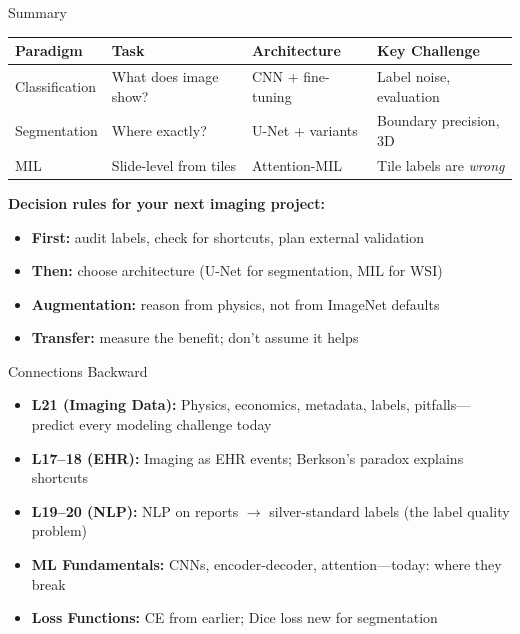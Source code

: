 \documentclass[aspectratio=169,10pt]{beamer}
\begin{document}
\begin{frame}{Summary}
\begin{center}
\renewcommand{\arraystretch}{1.3}
{\small
\begin{tabular}{lp{3.3cm}p{2.8cm}p{3cm}}
\toprule
\textbf{Paradigm} & \textbf{Task} & \textbf{Architecture} & \textbf{Key Challenge} \\
\midrule
Classification & What does image show? & CNN + fine-tuning & Label noise, evaluation \\
Segmentation & Where exactly? & U-Net + variants & Boundary precision, 3D \\
MIL & Slide-level from tiles & Attention-MIL & Tile labels are \emph{wrong} \\
\bottomrule
\end{tabular}
}
\end{center}

\textbf{Decision rules for your next imaging project:}
\begin{itemize}[<+->]
    \item \textbf{First:} audit labels, check for shortcuts, plan external validation
    \item \textbf{Then:} choose architecture (U-Net for segmentation, MIL for WSI)
    \item \textbf{Augmentation:} reason from physics, not from ImageNet defaults
    \item \textbf{Transfer:} measure the benefit; don't assume it helps
\end{itemize}
\end{frame}

\begin{frame}{Connections Backward}
\begin{itemize}[<+->]
    \item \textbf{L21 (Imaging Data):} Physics, economics, metadata, labels, pitfalls---predict every modeling challenge today
    \item \textbf{L17--18 (EHR):} Imaging as EHR events; Berkson's paradox explains shortcuts
    \item \textbf{L19--20 (NLP):} NLP on reports $\to$ silver-standard labels (the label quality problem)
    \item \textbf{ML Fundamentals:} CNNs, encoder-decoder, attention---today: where they break
    \item \textbf{Loss Functions:} CE from earlier; Dice loss new for segmentation
\end{itemize}
\end{frame}
\end{document}
